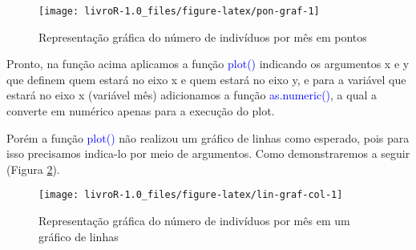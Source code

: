 \documentclass[14pt,titlepage, oneside, openany, a4paper]{book}
\newenvironment{Shaded}{\begin{snugshade}}{\end{snugshade}}
\newcommand{\DataTypeTok}[1]{\textcolor[rgb]{0.13,0.29,0.53}{#1}}
\newcommand{\KeywordTok}[1]{\textcolor[rgb]{0.13,0.29,0.53}{\textbf{#1}}}
\newcommand{\NormalTok}[1]{#1}
\newcommand{\OperatorTok}[1]{\textcolor[rgb]{0.81,0.36,0.00}{\textbf{#1}}}
\newcommand{\StringTok}[1]{\textcolor[rgb]{0.31,0.60,0.02}{#1}}
\begin{document}
\begin{Shaded}
\end{Shaded}

\begin{figure}[H]

{\centering \texttt{[image: livroR-1.0\_files/figure-latex/pon-graf-1]} 

}

\caption{Representação gráfica do número de indivíduos por mês em pontos}\label{fig:pon-graf}
\end{figure}

Pronto, na função acima aplicamos a função \textcolor{blue}{plot()} indicando os argumentos x e y que definem quem estará no eixo x e quem estará no eixo y, e para a variável que estará no eixo x (variável mês) adicionamos a função \textcolor{blue}{as.numeric()}, a qual a converte em numérico apenas para a execução do plot.

Porém a função \textcolor{blue}{plot()} não realizou um gráfico de linhas como esperado, pois para isso precisamos indica-lo por meio de argumentos. Como demonstraremos a seguir (Figura \ref{fig:lin-graf-col}).

\begin{Shaded}
\end{Shaded}

\begin{figure}[H]

{\centering \texttt{[image: livroR-1.0\_files/figure-latex/lin-graf-col-1]} 

}

\caption{Representação gráfica do número de indivíduos por mês em um gráfico de linhas}\label{fig:lin-graf-col}
\end{figure}
\end{document}
